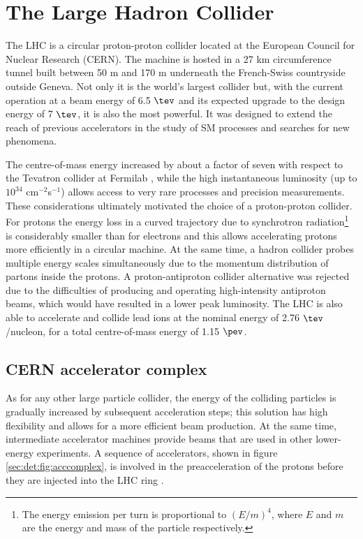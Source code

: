 \section{The Large Hadron Collider}
\label{chp:det:LHC}

The LHC \cite{Evans:2008zzb} is a circular proton-proton collider located at the European Council for Nuclear Research (CERN). The machine is hosted in a 27 km circumference tunnel built between 50 m and 170 m underneath the French-Swiss countryside outside Geneva. Not only it is the world's largest collider but, with the current operation at a beam energy of 6.5 $\tev$ and its expected upgrade to the design energy of 7 $\tev$, it is also the most powerful.  It was designed to extend the reach of previous accelerators in the study of SM processes and searches for new phenomena.\par
The centre-of-mass energy increased by about a factor of seven with respect to the Tevatron collider at Fermilab \cite{fermilab}, while the high instantaneous luminosity (up to $10^{34}$ cm$^{-2}$s$^{-1}$) allows access to very rare processes and precision measurements. These considerations ultimately motivated the choice of a proton-proton collider. For protons the energy loss in a curved trajectory due to synchrotron radiation\footnote{The energy emission per turn is proportional to $(E/m)^{4}$, where $E$ and $m$ are the energy and mass of the particle respectively.}  is considerably smaller than for electrons and this allows accelerating protons more efficiently in a circular machine. At the same time, a hadron collider probes multiple energy scales simultaneously due to the momentum distribution of partons inside the protons.  A proton-antiproton collider alternative was rejected due to the difficulties of producing and operating high-intensity antiproton beams, which would have resulted in a lower peak luminosity. The LHC is also able to accelerate and collide lead ions at the nominal energy of 2.76 $\tev$/nucleon, for a total centre-of-mass energy of 1.15 $\pev$.

\subsection{CERN accelerator complex}

As for any other large particle collider, the energy of the colliding particles is gradually increased by subsequent acceleration steps; this solution has high flexibility and allows for a more efficient beam production. At the same time, intermediate accelerator machines provide beams that are used in other lower-energy experiments. A sequence of accelerators, shown in figure \ref{sec:det:fig:acccomplex}, is involved in the preacceleration of the protons before they are injected into the LHC ring \cite{Benedikt:2004wm}.

